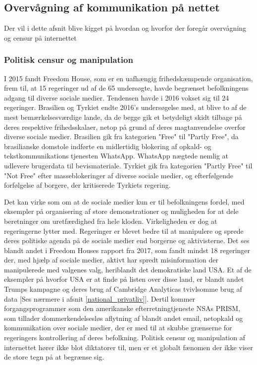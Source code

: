 \subsection{Overvågning af kommunikation på nettet}
Der vil i dette afsnit blive kigget på hvordan og hvorfor der foregår overvågning og censur på internettet%

\subsubsection{Politisk censur og manipulation}
\label{politisk_censur}
I 2015 fandt Freedom House, som er en uafhængig frihedskæmpende organisation, frem til, at 15 regeringer ud af de 65 undersøgte, havde begrænset befolkningens adgang til diverse sociale medier.\cite{FreedomHouseRapport2016} Tendensen havde i 2016 vokset sig til 24 regeringer.\cite{FreedomHouseRapport2016} Brasilien og Tyrkiet endte 2016's undersøgelse med, at blive to af de mest bemærkelsesværdige lande, da de begge gik et betydeligt skidt tilbage på deres respektive frihedsskalaer, netop på grund af deres magtanvendelse overfor diverse sociale medier. Brasilien gik fra kategorien "Free" til "Partly Free", da brasilianske domstole indførte en midlertidig blokering af opkald- og tekstkommunikations tjenesten WhatsApp. WhatsApp nægtede nemlig at udlevere brugerdata til bevismateriale. Tyrkiet gik fra kategorien "Partly Free" til "Not Free" efter masseblokeringer af diverse sociale medier, og efterfølgende forfølgelse af borgere, der kritiserede Tyrkiets regering.\cite{FreedomHouseRapport2016}

Det kan virke som om at de sociale medier kun er til befolkningens fordel, med eksempler på organisering af store demonstrationer og muligheden for at dele beretninger om uretfærdighed fra hele kloden. Virkeligheden er dog at regeringerne lytter med. Regeringer er blevet bedre til at manipulere og sprede deres politiske agenda på de sociale medier end borgerne og aktivisterne.\cite{SocialHelpDictators} Det ses blandt andet i Freedom Houses rapport fra 2017, som fandt mindst 18 regeringer der, med hjælp af sociale medier, aktivt har spredt misinformation der manipulerede med valgenes valg, heriblandt det demokratiske land USA.\cite{FreedomHouseRapport2017} Et af de eksempler på hvorfor USA er at finde på listen over disse land, er blandt andet Trumps kampagne og deres brug af Cambridge Analyticas tvivlsomme brug af data [Ses nærmere i afsnit \ref{national_privatliv}].\cite{Cambridge_Analytica_Zuckerberg}
Dertil kommer forgangsprogrammer som den amerikanske efterretningtjeneste NSAs PRISM, som tillader dommerkendelsesløs aflytning af blandt andet email, netopkald og kommunikation over sociale medier,\cite{PRISM} der er med til at skubbe grænserne for regeringers kontrollering af deres befolkning. Politisk censur og manipulation af internettet hører ikke blot diktatorer til, men er et globalt fænomen der ikke viser de store tegn på at begrænse sig.\cite{FreedomHouseRapport2017}

